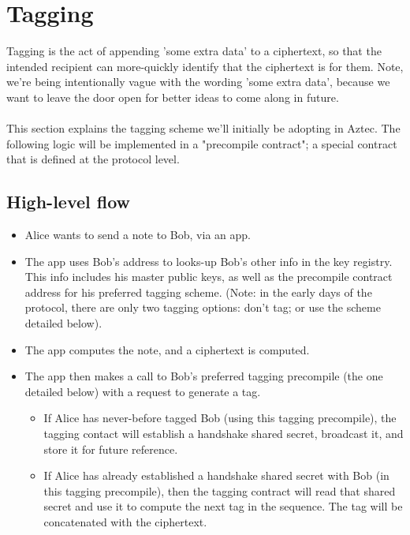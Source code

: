 \section{Tagging}


Tagging is the act of appending 'some extra data' to a ciphertext, so that the intended recipient can more-quickly identify that the ciphertext is for them.
Note, we're being intentionally vague with the wording 'some extra data', because we want to leave the door open for better ideas to come along in future.\\
\\
This section explains the tagging scheme we'll initially be adopting in Aztec.
The following logic will be implemented in a "precompile contract"; a special contract that is defined at the protocol level.

\subsection{High-level flow}

\begin{itemize}
    \item Alice wants to send a note to Bob, via an app.
    \item The app uses Bob's address to looks-up Bob's other info in the key registry. This info includes his master public keys, as well as the precompile contract address for his preferred tagging scheme. (Note: in the early days of the protocol, there are only two tagging options: don't tag; or use the scheme detailed below).
    \item The app computes the note, and a ciphertext is computed.
    \item The app then makes a call to Bob's preferred tagging precompile (the one detailed below) with a request to generate a tag.
    \begin{itemize}
        \item If Alice has never-before tagged Bob (using this tagging precompile), the tagging contact will establish a handshake shared secret, broadcast it, and store it for future reference.
        \item If Alice has already established a handshake shared secret with Bob (in this tagging precompile), then the tagging contract will read that shared secret and use it to compute the next tag in the sequence. The tag will be concatenated with the ciphertext.
    \end{itemize}
\end{itemize}






